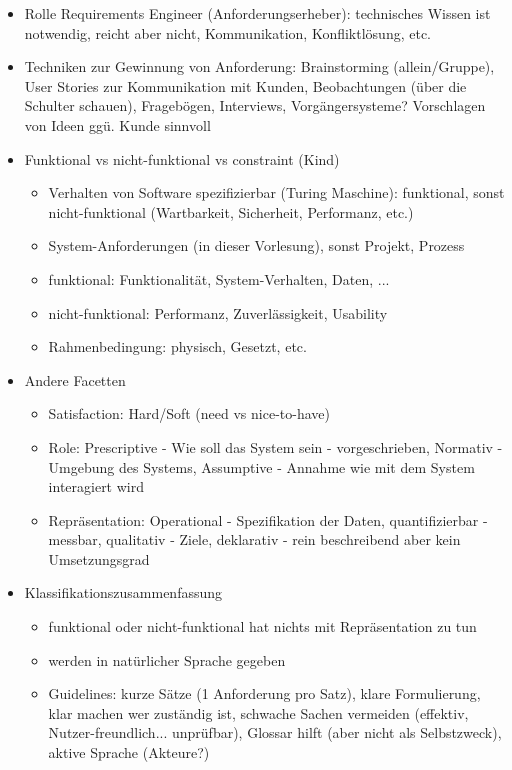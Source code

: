 \documentclass[paper=a4, fontsize=11pt]{scrartcl} %
\numberwithin{equation}{section} %
\numberwithin{figure}{section} %
\numberwithin{table}{section} %
\begin{document}
\begin{itemize}
  \item Rolle Requirements Engineer (Anforderungserheber): technisches Wissen ist notwendig, reicht aber nicht, Kommunikation, Konfliktlösung, etc.
  \item Techniken zur Gewinnung von Anforderung: Brainstorming (allein/Gruppe), User Stories zur Kommunikation mit Kunden, Beobachtungen (über die Schulter schauen), Fragebögen, Interviews, Vorgängersysteme? Vorschlagen von Ideen ggü. Kunde sinnvoll
  \item Funktional vs nicht-funktional vs constraint (Kind)
  \begin{itemize}
    \item Verhalten von Software spezifizierbar (Turing Maschine): funktional, sonst nicht-funktional (Wartbarkeit, Sicherheit, Performanz, etc.)
    \item System-Anforderungen (in dieser Vorlesung), sonst Projekt, Prozess
    \item funktional: Funktionalität, System-Verhalten, Daten, ...
    \item nicht-funktional: Performanz, Zuverlässigkeit, Usability
    \item Rahmenbedingung: physisch, Gesetzt, etc.
  \end{itemize}
  \item Andere Facetten
  \begin{itemize}
    \item Satisfaction: Hard/Soft (need vs nice-to-have)
    \item Role: Prescriptive - Wie soll das System sein - vorgeschrieben, Normativ - Umgebung des Systems, Assumptive - Annahme wie mit dem System interagiert wird
    \item Repräsentation: Operational - Spezifikation der Daten, quantifizierbar - messbar, qualitativ - Ziele, deklarativ - rein beschreibend aber kein Umsetzungsgrad
  \end{itemize}
  \item Klassifikationszusammenfassung
  \begin{itemize}
    \item funktional oder nicht-funktional hat nichts mit Repräsentation zu tun
    \item werden in natürlicher Sprache gegeben
    \item Guidelines: kurze Sätze (1 Anforderung pro Satz), klare Formulierung, klar machen wer zuständig ist, schwache Sachen vermeiden (effektiv, Nutzer-freundlich... unprüfbar), Glossar hilft (aber nicht als Selbstzweck), aktive Sprache (Akteure?)

\end{itemize}
\end{itemize}
\end{document}
